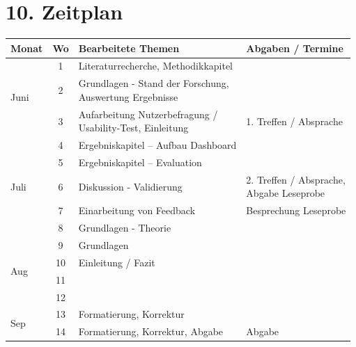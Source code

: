 \section*{10. Zeitplan}
\begin{table}[h]
\begin{tabular}{|l|c|l|l|}
\hline
Monat                 & Wo & Bearbeitete Themen & Abgaben / Termine \\ \hline
\multirow{3}{*}{Juni} & 1  & Literaturrecherche, Methodikkapitel  &                   \\ \cline{2-4} 
                      & 2  & \makecell[l]{Grundlagen - Stand der Forschung,\\ Auswertung Ergebnisse} &                   \\ \cline{2-4} 
                      & 3  & \makecell[l]{Aufarbeitung Nutzerbefragung / \\ Usability-Test, Einleitung} & 1. Treffen / Absprache \\ \hline
\multirow{5}{*}{Juli} & 4  & Ergebniskapitel – Aufbau Dashboard &                   \\ \cline{2-4} 
                      & 5  & Ergebniskapitel – Evaluation &                   \\ \cline{2-4} 
                      & 6  & Diskussion - Validierung & \makecell[l]{2. Treffen / Absprache, \\ Abgabe Leseprobe} \\ \cline{2-4} 
                      & 7  & Einarbeitung von Feedback & Besprechung Leseprobe \\ \cline{2-4} 
                      & 8  & Grundlagen - Theorie &                   \\ \hline
\multirow{4}{*}{Aug}  & 9  & Grundlagen         &                   \\ \cline{2-4} 
                      & 10 & Einleitung / Fazit &                   \\ \cline{2-4} 
                      & 11 &                    &                   \\ \cline{2-4} 
                      & 12 &                    &                   \\ \hline
\multirow{2}{*}{Sep}  & 13 & Formatierung, Korrektur &                   \\ \cline{2-4} 
                      & 14 & Formatierung, Korrektur, Abgabe & Abgabe \\ \hline
\end{tabular}
\end{table}